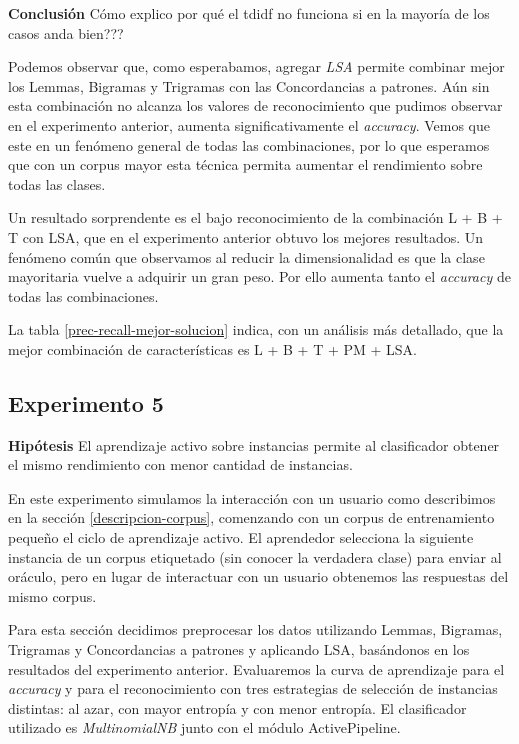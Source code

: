 \vspace{3 mm}

\textbf{Conclusión}
Cómo explico por qué el tdidf no funciona si en la mayoría de los casos anda bien???

Podemos observar que, como esperabamos, agregar \textit{LSA} permite combinar mejor los Lemmas, Bigramas y Trigramas con las Concordancias a patrones. Aún sin esta combinación no alcanza los valores de reconocimiento que pudimos observar en el experimento anterior, aumenta significativamente el \textit{accuracy}. Vemos que este en un fenómeno general de todas las combinaciones, por lo que esperamos que con un corpus mayor esta técnica permita aumentar el rendimiento sobre todas las clases.

Un resultado sorprendente es el bajo reconocimiento de la combinación L + B + T con LSA, que en el experimento anterior obtuvo los mejores resultados. Un fenómeno común que observamos al reducir la dimensionalidad es que la clase mayoritaria vuelve a adquirir un gran peso. Por ello aumenta tanto el \textit{accuracy} de todas las combinaciones.

La tabla \ref{prec-recall-mejor-solucion} indica, con un análisis más detallado, que la mejor combinación de características es L + B + T + PM + LSA.

\subsection{Experimento 5}\label{experimento-aa-instancias}
\vspace{3 mm}
\textbf{Hipótesis} El aprendizaje activo sobre instancias permite al clasificador obtener el mismo rendimiento con menor cantidad de instancias.
\vspace{3 mm}

En este experimento simulamos la interacción con un usuario como describimos en la sección \ref{descripcion-corpus}, comenzando con un corpus de entrenamiento pequeño el ciclo de aprendizaje activo. El aprendedor selecciona la siguiente instancia de un corpus etiquetado (sin conocer la verdadera clase) para enviar al oráculo, pero en lugar de interactuar con un usuario obtenemos las respuestas del mismo corpus.

Para esta sección decidimos preprocesar los datos utilizando Lemmas, Bigramas, Trigramas y Concordancias a patrones y aplicando LSA, basándonos en los resultados del experimento anterior. Evaluaremos la curva de aprendizaje para el \textit{accuracy} y para el reconocimiento con tres estrategias de selección de instancias distintas: al azar, con mayor entropía y con menor entropía. El clasificador utilizado es \textit{MultinomialNB} junto con el módulo ActivePipeline.

